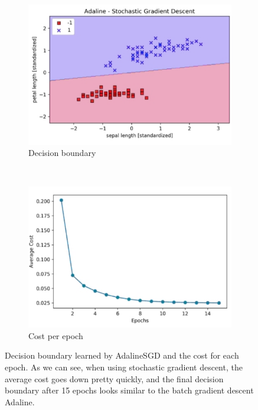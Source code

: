 \documentclass[11pt]{article}
\begin{document}
    \begin{figure}[hbt!]
        \centering
        \begin{subfigure}[t]{.50\textwidth}
            \centering
            \includegraphics[width=\columnwidth,trim=1 1 1 1,clip]{img/ada_sgd_2class_dec.png}
            \caption{Decision boundary}
            \label{fig:ada_sgd_2class_dec}
        \end{subfigure}
        ~ %
        \begin{subfigure}[t]{.46\textwidth}
            \centering
            \includegraphics[width=\columnwidth,trim=1 1 1 1,clip]{img/ada_sgd_2class_cost.png}
            \caption{Cost per epoch}
            \label{fig:ada_sgd_2class_cost}
        \end{subfigure}
        \caption{Decision boundary learned by AdalineSGD and the cost for each epoch.
        As we can see, when using stochastic gradient descent, the average cost goes down pretty quickly, and the final decision boundary after 15 epochs looks similar to the batch gradient descent Adaline.}
        \label{fig:ada_sgd_2class}
    \end{figure}
\end{document}
